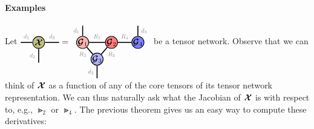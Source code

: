 \paragraph{Examples}
Let 
$\begin{tikzpicture}[baseline=\baseline]
    \tikzset{tensor/.style = {minimum size = 0.5cm,shape = circle,thick,draw=black,inner sep = 0pt}, edge/.style = {thick,line width=.4mm},every loop/.style={}}
    \def\x{0}
    \def\y{0}
     \node[tensor,fill=green!50!red!50!white] (B) at (\x+1,\y) {$\Xt$};
    \draw[edge] (B) -- (\x+0.25,0) node [midway,above] {\scalebox{0.7}{\dimcolor{$d_1$}}};
    \draw[edge] (B) -- (\x+1.85,\y) node [midway,above] {\scalebox{0.7}{\dimcolor{$d_3$}}};
    \draw[edge] (B) -- (\x+1,\y-0.85) node [midway,left] {\scalebox{0.7}{\dimcolor{$d_2$}}};
\end{tikzpicture}
=
\begin{tikzpicture}[baseline=\baseline]
    \tikzset{tensor/.style = {minimum size = 0.5cm,shape = circle,thick,draw=black,inner sep = 0pt}, edge/.style = {thick,line width=.4mm},every loop/.style={}}
    \def\x{0}
    \def\y{0}
    \node[tensor,fill=red!30!white] (A) at (\x+2,\y) {$\Gt_1$};
    \node[tensor,fill=red!50!white] (B) at (\x+3.2,\y) {$\Gt_2$};
    \node[tensor,fill=blue!30!white] (C) at (\x+2.6,\y-0.7) {$\Gt_3$};
    \node[tensor,fill=blue!50!white] (D) at (\x+4.3,\y) {$\Gt_4$};
    \draw[edge] (A) -- (B) node [midway,above] {\scalebox{0.7}{\dimcolor{$R_1$}}};
    \draw[edge] (A) -- (C);
    \node[draw=none] () at (\x+2,\y-0.5) {\scalebox{0.7}{\dimcolor{$R_2$}}};
    \draw[edge] (B) -- (C);
    \node[draw=none] () at (\x+3.2,\y-0.5) {\scalebox{0.7}{\dimcolor{$R_3$}}};
    \draw[edge] (B) -- (D) node [midway,above] {\scalebox{0.7}{\dimcolor{$R_4$}}};
    \draw[edge] (A) -- (\x+2,\y+0.7) node [midway,left] {\scalebox{0.7}{\dimcolor{$d_1$}}};
    \draw[edge] (D) -- (\x+4.3,\y+0.7) node [midway,right] {\scalebox{0.7}{\dimcolor{$d_3$}}};
    \draw[edge] (C) -- (\x+2.6,\y-1.5) node [midway,left] {\scalebox{0.7}{\dimcolor{$d_2$}}};
\end{tikzpicture}
$ be a tensor network. Observe that we can think of $\bm{\mathcal{X}}$ as a function of any of the core tensors of its tensor network representation. We can thus naturally ask what the Jacobian of $\bm{\mathcal{X}}$ is with respect to, e.g., $\Gt_2$ or $\Gt_4$.
The previous theorem gives us an easy way to compute these derivatives:
